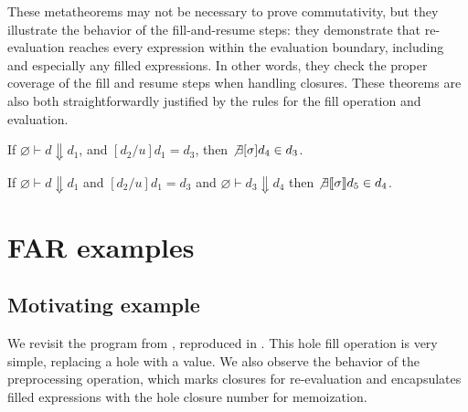 These metatheorems may not be necessary to prove commutativity, but they illustrate the behavior of the fill-and-resume steps: they demonstrate that re-evaluation reaches every expression within the evaluation boundary, including and especially any filled expressions. In other words, they check the proper coverage of the fill and resume steps when handling closures. These theorems are also both straightforwardly justified by the rules for the fill operation and evaluation.

\begin{theorem}
  If $\varnothing\vdash d\Downarrow d_1$, and $[d_2/u]d_1=d_3$, then $\not\exists[\sigma]d_4\in d_3$.
  \label{thm:fill-reeval}
\end{theorem}

\begin{theorem}
  If $\varnothing\vdash d\Downarrow d_1$ and $[d_2/u]d_1=d_3$ and $\varnothing\vdash d_3\Downarrow d_4$ then $\not\exists\llbracket\sigma\rrbracket d_5\in d_4$.
  \label{thm:resume-reeval}
\end{theorem}

\section{FAR examples}
\label{sec:far-examples}

\subsection{Motivating example}
\label{sec:far-motivating-example}

We revisit the program from , reproduced in . This hole fill operation is very simple, replacing a hole with a value. We also observe the behavior of the preprocessing operation, which marks closures for re-evaluation and encapsulates filled expressions with the hole closure number for memoization.

